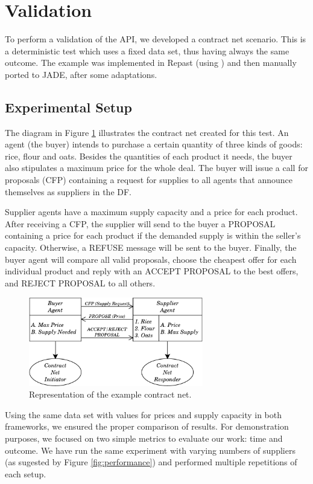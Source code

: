 \section{Validation}
\label{sec:verification}

To perform a validation of the API, we developed a contract net scenario. This is a deterministic test which uses a fixed data set, thus having always the same outcome. The example was implemented in Repast (using \apiname{}) and then manually ported to JADE, after some adaptations.

\subsection{Experimental Setup}

The diagram in Figure \ref{fig:CNetExample} illustrates the contract net created for this test. An agent (the buyer) intends to purchase a certain quantity of three kinds of goods: rice, flour and oats. Besides the quantities of each product it needs, the buyer also stipulates a maximum price for the whole deal. The buyer will issue a call for proposals (CFP) containing a request for supplies to all agents that announce themselves as suppliers in the DF.

Supplier agents have a maximum supply capacity and a price for each product. After receiving a CFP, the supplier will send to the buyer a PROPOSAL containing a price for each product if the demanded supply is within the seller's capacity. Otherwise, a REFUSE message will be sent to the buyer.
Finally, the buyer agent will compare all valid proposals, choose the cheapest offer for each individual product and reply with an ACCEPT PROPOSAL to the best offers, and REJECT PROPOSAL to all others.

\begin{figure}
	\centering
	\includegraphics[width=3.0in]{figures/CNetExample.pdf}
	\caption{
		Representation of the example contract net.
	}
	\label{fig:CNetExample}
\end{figure}

Using the same data set with values for prices and supply capacity in both frameworks, we ensured the proper comparison of results. For demonstration purposes, we focused on two simple metrics to evaluate our work: time and outcome. We have run the same experiment with varying numbers of suppliers (as sugested by Figure \ref{fig:performance}) and performed multiple repetitions of each setup.

